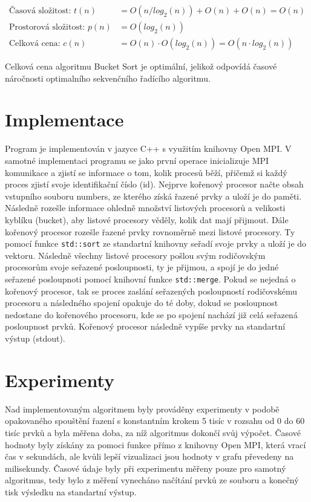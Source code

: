 \documentclass[12pt, a4paper]{article}
\begin{document}
\begin{equation}
\begin{split}
\text{Časová složitost: }t(n) &= O(n/log_{2}(n)) + O(n) + O(n) = O(n)\\
\text{Prostorová složitost: }p(n) &= O(log_{2}(n))\\
\text{Celková cena: }c(n) &= O(n) \cdot O(log_{2}(n)) = O(n\cdot log_{2}(n))
\end{split}
\end{equation}

Celková cena algoritmu Bucket Sort je optimální, jelikož odpovídá časové náročnosti optimalního sekvenčního řadícího algoritmu.

\section{Implementace}
Program je implementován v jazyce C++ s využitím knihovny Open MPI. V samotné implementaci programu se jako první operace inicializuje MPI komunikace a zjistí se informace o tom, kolik procesů běží, přičemž si každý proces zjistí svoje identifikační číslo (id). Nejprve kořenový procesor načte obsah vstupního souboru numbers, ze kterého získá řazené prvky a uloží je do paměti. Následně rozešle informace ohledně množství listových procesorů a velikosti kyblíku (bucket), aby listové procesory věděly, kolik dat mají přijmout. Dále kořenový procesor rozešle řazené prvky rovnoměrně mezi listové procesory. Ty pomocí funkce \texttt{std::sort} ze standartní knihovny seřadí svoje prvky a uloží je do vektoru. Následně všechny listové procesory pošlou svým rodičovským procesorům svoje seřazené posloupnosti, ty je přijmou, a spojí je do jedné seřazené posloupnoti pomocí knihovní funkce \texttt{std::merge}. Pokud se nejedná o kořenový procesor, tak se proces zaslání seřazených posloupností rodičovskému procesoru a následného spojení opakuje do té doby, dokud se posloupnost nedostane do kořenového procesoru, kde se po spojení nachází již celá seřazená posloupnost prvků. Kořenový procesor následně vypíše prvky na standartní výstup (stdout).

\section{Experimenty}
Nad implementovaným algoritmem byly prováděny experimenty v podobě opakovaného spouštění řazení s konstantním krokem 5 tisíc v rozsahu od 0 do 60 tisíc prvků a byla měřena doba, za níž algoritmus dokončí svůj výpočet. Časové hodnoty byly získány za pomoci funkce přímo z knihovny Open MPI, která vrací čas v sekundách, ale kvůli lepší vizualizaci jsou hodnoty v grafu převedeny na milisekundy. Časové údaje byly při experimentu měřeny pouze pro samotný algoritmus, tedy bylo z měření vynecháno načítání prvků ze souboru a konečný tisk výsledku na standartní výstup.
\end{document}
